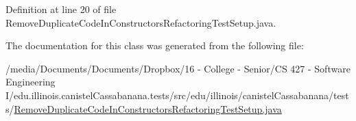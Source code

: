 Definition at line 20 of file RemoveDuplicateCodeInConstructorsRefactoringTestSetup.java.



The documentation for this class was generated from the following file:\begin{DoxyCompactItemize}
\item 
/media/Documents/Documents/Dropbox/16 -\/ College -\/ Senior/CS 427 -\/ Software Engineering I/edu.illinois.canistelCassabanana.tests/src/edu/illinois/canistelCassabanana/tests/\hyperlink{RemoveDuplicateCodeInConstructorsRefactoringTestSetup_8java}{RemoveDuplicateCodeInConstructorsRefactoringTestSetup.java}\end{DoxyCompactItemize}
